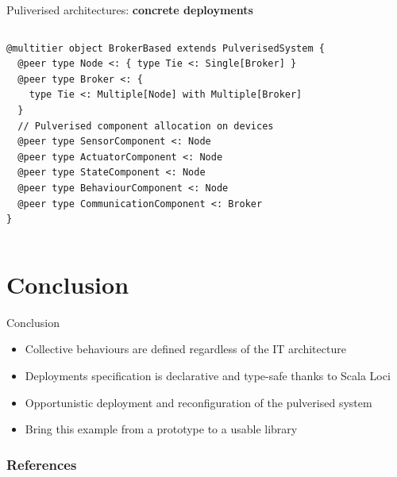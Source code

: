\documentclass[aspectratio=169]{beamer}
\begin{document}
\begin{frame}[fragile]{Puliverised architectures: \textbf{concrete deployments}}
  \begin{columns}
    \begin{column}{0.7\textwidth}
      \begin{cardTiny}
        \begin{verbatim}
@multitier object BrokerBased extends PulverisedSystem {
  @peer type Node <: { type Tie <: Single[Broker] }
  @peer type Broker <: { 
    type Tie <: Multiple[Node] with Multiple[Broker] 
  }
  // Pulverised component allocation on devices
  @peer type SensorComponent <: Node
  @peer type ActuatorComponent <: Node
  @peer type StateComponent <: Node
  @peer type BehaviourComponent <: Node
  @peer type CommunicationComponent <: Broker
}
        \end{verbatim}
      \end{cardTiny}
    \end{column}
    \begin{column}{0.3\textwidth}
    \end{column}
  \end{columns}
\end{frame}
\section{Conclusion}
\begin{frame}{Conclusion}
  \begin{card}[Benefits]
    \begin{itemize}
      \item<1-> Collective behaviours are defined regardless of the IT architecture
      \item<2-> Deployments specification is declarative and type-safe thanks to Scala Loci
    \end{itemize}
  \end{card}
  \pause
  \begin{card}
    \begin{itemize}
      \item <3-> Opportunistic deployment and reconfiguration of the pulverised system
      \item <4-> Bring this example from a prototype to a usable library
    \end{itemize}
  \end{card}
\end{frame}

\begin{frame}[allowframebreaks]
\frametitle{References}
%
% 
\printbibliography
\end{frame}
\end{document}
